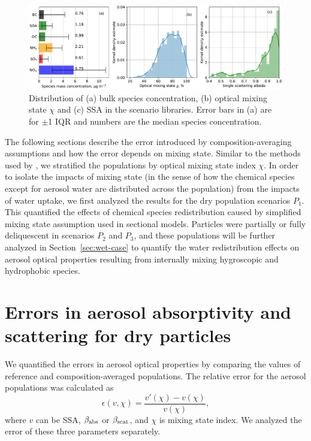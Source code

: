 \documentclass[edeposit,fullpage]{uiucthesis2009}
\begin{document}
\begin{figure}
	\centering
	\includegraphics[scale=0.5]{chap4_figs/fig3.pdf}
	\caption{Distribution of (a) bulk species concentration, (b)
          optical mixing state $\chi$ and (c) SSA in the scenario
          libraries. Error bars in (a) are for $\pm$1 IQR and numbers are the median species
          concentration.}
	\label{fig2:sce_overview}
\end{figure}

The following sections describe the error introduced by
composition-averaging assumptions and how the error depends on mixing
state. Similar to the methods used by \citet{Ching2017}, we stratified
the populations by optical mixing state index $\chi$. In order to
isolate the impacts of mixing state (in the sense of how the chemical
species except for aerosol water are distributed across the
population) from the impacts of water uptake, we first analyzed the
results for the dry population scenarios $P_1$. This quantified the
effects of chemical species redistribution caused by simplified mixing
state assumption used in sectional models. Particles were partially or
fully deliquescent in scenarios $P_2$ and $P_3$, and these populations
will be further analyzed in Section~\ref{sec:wet-case} to quantify the
water redistribution effects on aerosol optical properties resulting
from internally mixing hygroscopic and hydrophobic species.

\section{Errors in aerosol absorptivity and scattering for dry particles}
\label{sec:dry-case}
We quantified the errors in aerosol optical properties by comparing
the values of reference and composition-averaged
populations. The relative error for the aerosol
populations was calculated as
\begin{equation}
  \epsilon(v,\chi) = \frac{v'(\chi) - v(\chi)}{v(\chi)}, 
\end{equation}
where $v$ can be SSA, $\beta_{\rm abs}$ or $\beta_{\rm scat}$, and
$\chi$ is mixing state index. We analyzed the error of these three
parameters separately.
\end{document}

